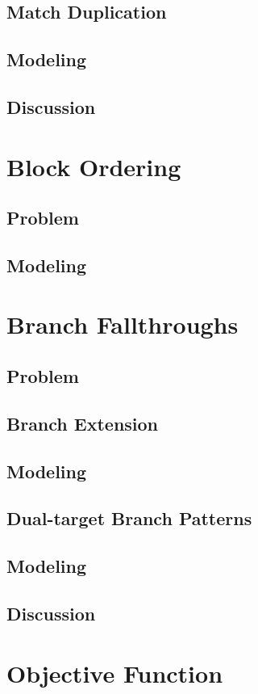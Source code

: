\subsection{Match Duplication}
\subsection{Modeling}
\subsection{Discussion}

\section{Block Ordering}
\subsection{Problem}
\subsection{Modeling}

\section{Branch Fallthroughs}
\subsection{Problem}
\subsection{Branch Extension}
\subsection{Modeling}
\subsection{Dual-target Branch Patterns}
\subsection{Modeling}
\subsection{Discussion}

\section{Objective Function}
